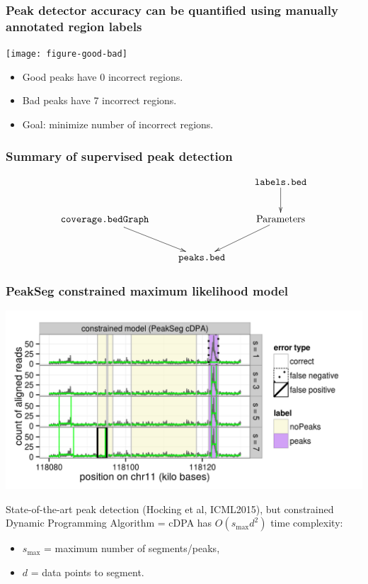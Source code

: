 \documentclass{beamer}
\begin{document}
\begin{frame}
  \frametitle{Peak detector accuracy can be quantified using manually
    annotated region labels}
  
  \texttt{[image: figure-good-bad]}

  \begin{itemize}
  \item Good peaks have 0 incorrect regions.
  \item Bad peaks have 7 incorrect regions.
  \item Goal: minimize number of incorrect regions.
  \end{itemize}

\end{frame}

\begin{frame}
  \frametitle{Summary of supervised peak detection}
  \begin{displaymath}
  \xymatrix{
    & & \texttt{labels.bed} \ar [d]
    \\
    \texttt{coverage.bedGraph}
    \ar [dr] 
    & \text{ }
    & \text{Parameters} 
    \ar [dl]
    \\
    & \texttt{peaks.bed}
  }
  \end{displaymath}
  
\end{frame}


\begin{frame}
  \frametitle{PeakSeg constrained maximum likelihood model}
  \includegraphics[width=\textwidth]{figure-Segmentor-PeakSeg-constrained-regions}

  State-of-the-art peak detection (Hocking et al, ICML2015), but
  constrained Dynamic Programming Algorithm = cDPA has
  $O(s_{\text{max}} d^2)$ time complexity:
  \begin{itemize}
  \item $s_{\text{max}}$ = maximum number of segments/peaks,
  \item $d$ = data points to segment.
  \end{itemize}
\end{frame}
\end{document}
